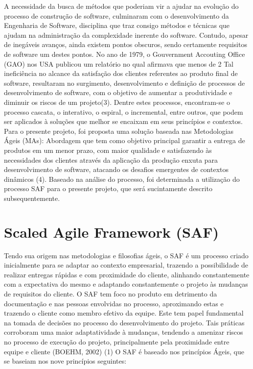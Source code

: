 A necessidade da busca de métodos que poderiam vir a ajudar na evolução do processo de construção de software, culminaram com o desenvolvimento da Engenharia de Software, disciplina que traz consigo métodos e técnicas que ajudam na administração da complexidade inerente do software. Contudo, apesar de inegáveis avanços, ainda existem pontos obscuros, sendo certamente requisitos de software um destes pontos.
No ano de 1979, o Gouvernment Accouting Office (GAO) nos USA publicou um relatório no qual afirmava que menos de 2%
Tal ineficiência no alcance da satisfação dos clientes referentes ao produto final de software, resultaram no surgimento, desenvolvimento e definição de processos de desenvolvimento de software, com o objetivo de aumentar a produtividade e diminuir os riscos de um projeto(3).
Dentre estes processos, encontram-se o processo cascata, o interativo, o espiral, o incremental, entre outros, que podem ser aplicados à soluções que melhor se encaixam em seus princípios e contextos. Para o presente projeto, foi proposta uma solução baseada nas Metodologias Ágeis (MAs): Abordagem que tem como objetivo principal garantir a entrega de produtos em um menor prazo, com maior qualidade e satisfazendo às necessidades dos clientes através da aplicação da produção enxuta para desenvolvimento de software, atacando os desafios emergentes de contextos dinâmicos (4). Baseado na análise do processo, foi determinada a utilização do processo SAF para o presente projeto, que será sucintamente descrito subsequentemente.

\section {Scaled Agile Framework (SAF)}

Tendo sua origem nas metodologias e filosofias ágeis, o SAF é um processo criado inicialmente para se adaptar ao contexto empresarial, trazendo a possibilidade de realizar entregas rápidas e com proximidade do cliente, alinhando constantemente com a expectativa do mesmo e adaptando constantemente o projeto às mudanças de requisitos do cliente.
O SAF tem foco  no produto em detrimento da documentação e nas pessoas envolvidas no processo, aproximando estas e trazendo o cliente como membro efetivo da equipe. Este tem papel fundamental na tomada de decisões no processo do desenvolvimento do projeto.
Tais práticas corroboram uma maior adaptatividade à mudanças, tendendo a amenizar riscos no processo de execução do projeto, principalmente pela proximidade entre equipe e cliente (BOEHM, 2002) (1)
O SAF é baseado nos princípios Ágeis, que se baseiam nos nove princípios seguintes:


